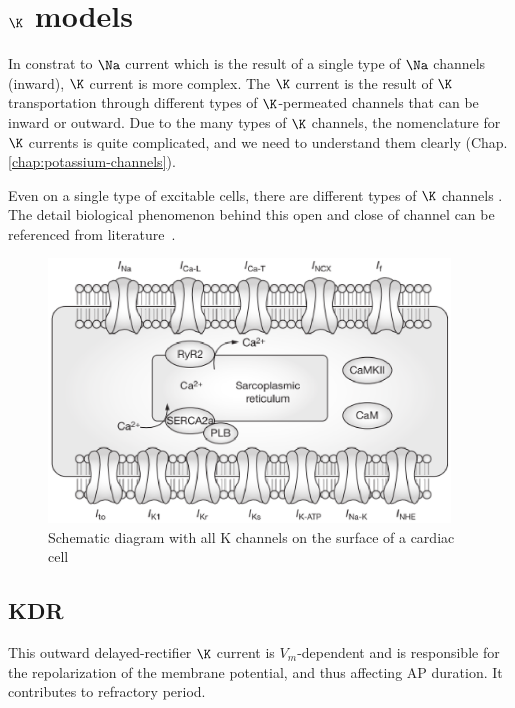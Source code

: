 \chapter{$\K$ models}
\label{chap:K_model}

\def\Cl{{\text{Cl}^{-}}}
\def\rest{{\text{rest}}}
\def\Erev{{\text{E}_{\text{rev}}}}
\def\KIR{{\text{KIR}}}

In constrat to $\Na$ current which is the result of a single type of $\Na$
channels (inward), $\K$ current is more complex. The $\K$ current is the result
of $\K$ transportation through different types of $\K$-permeated channels that
can be inward or outward.
Due to the many types of $\K$ channels, the nomenclature for $\K$ currents is
quite complicated, and we need to understand them clearly
(Chap.\ref{chap:potassium-channels}).

Even on a single type of excitable cells, there are different types of $\K$
channels \citep{rudy1988duk}. The detail biological phenomenon behind this open
and close of  channel can be referenced from
literature~\citep{yang1995evs,yang1996mbc,french1996ibp,larson1996tms,aggarwal1996css,seoh1996vsr}.

\begin{figure}[hbt]
  \centerline{\includegraphics[height=7cm,
    angle=0]{./images/K_channel_all.eps}}
  \caption{Schematic diagram with all K channels on the surface of a cardiac
  cell \citep{nass2008}}
  \label{fig:K_channel_all}
\end{figure}

\section{KDR}
\label{sec:I_Kdr}

This outward delayed-rectifier $\K$ current is $V_m$-dependent and is
responsible for the repolarization of the membrane potential, and thus affecting
AP duration. It contributes to refractory period.

